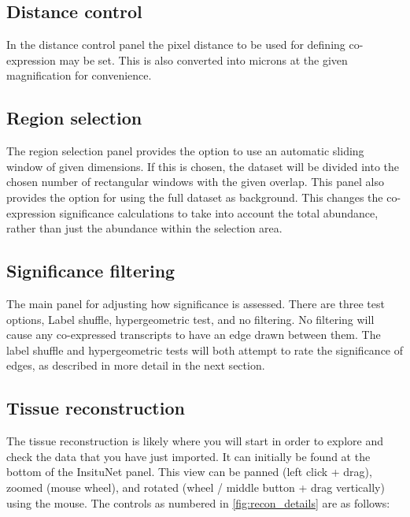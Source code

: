 \documentclass[a4paper,12pt]{article}
\begin{document}
\subsection{Distance control}
In the distance control panel the pixel distance to be used for defining co-expression may be set. This is also converted into microns at the given magnification for convenience.
\subsection{Region selection}
The region selection panel provides the option to use an automatic sliding window of given dimensions. If this is chosen, the dataset will be divided into the chosen number of rectangular windows with the given overlap. This panel also provides the option for using the full dataset as background. This changes the co-expression significance calculations to take into account the total abundance, rather than just the abundance within the selection area.
\subsection{Significance filtering}
The main panel for adjusting how significance is assessed. There are three test options, Label shuffle, hypergeometric test, and no filtering. No filtering will cause any co-expressed transcripts to have an edge drawn between them. The label shuffle and hypergeometric tests will both attempt to rate the significance of edges, as described in more detail in the next section.


\subsection{Tissue reconstruction}
The tissue reconstruction is likely where you will start in order to explore and check the data that you have just imported. It can initially be found at the bottom of the InsituNet panel. This view can be panned (left click + drag), zoomed (mouse wheel), and rotated (wheel / middle button + drag vertically) using the mouse. The controls as numbered in \ref{fig:recon_details} are as follows:
\end{document}
